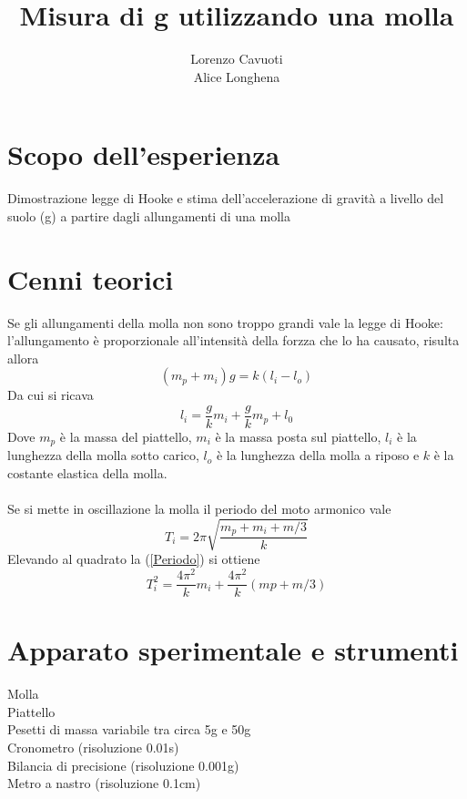 \documentclass{article}
\title{Misura di g utilizzando una molla}
\author{Lorenzo Cavuoti \\ Alice Longhena}
\begin{document}
	\maketitle
	
	\section{Scopo dell'esperienza}
		Dimostrazione legge di Hooke e stima dell’accelerazione di gravità a livello del suolo (g) a partire dagli allungamenti di una molla
	
	\section{Cenni teorici}
		Se gli allungamenti della molla non sono troppo grandi vale la legge di Hooke: l'allungamento è proporzionale all'intensit\`{a} della forzza che lo ha causato, risulta allora
		\begin{equation}
			(m_p+m_i)g=k(l_i-l_o)
			\label{hooke}
		\end{equation}
		Da cui si ricava
		\begin{equation}
		l_i = \frac{g}{k}m_i+\frac{g}{k}m_p+l_0
		\label{li}
		\end{equation}
		Dove $m_p$ \`{e} la massa del piattello, $m_i$ \`{e} la massa posta sul piattello, $l_i$ \`{e} la lunghezza della molla sotto carico, $l_o$ \`{e} la lunghezza della molla a riposo e $k$ \`{e} la costante elastica della molla.\\\\
		Se si mette in oscillazione la molla il periodo del moto armonico vale
		\begin{equation}
			T_i = 2\pi\sqrt{\frac{m_p+m_i+m/3}{k}}
			\label{Periodo}
		\end{equation}
		Elevando al quadrato la (\ref{Periodo}) si ottiene
		\begin{equation}
			T_i^2 = \frac{4\pi^2}{k}m_i+\frac{4\pi^2}{k}(mp+m/3)
			\label{Periodo2}
		\end{equation}

	\section{Apparato sperimentale e strumenti}
		Molla\\
		Piattello\\
		Pesetti di massa variabile tra circa 5g e 50g\\
		Cronometro (risoluzione 0.01s)\\
		Bilancia di precisione (risoluzione 0.001g)\\
		Metro a nastro (risoluzione 0.1cm)
	
\end{document}

